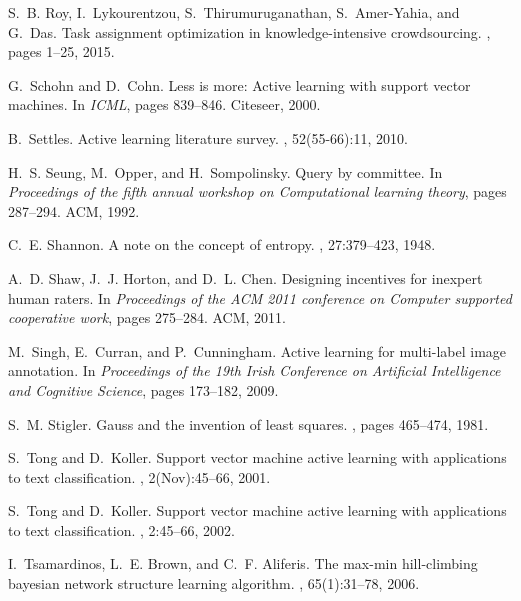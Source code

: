 \documentclass[11pt]{article}
\begin{document}
\begin{thebibliography}{10}
	S.~B. Roy, I.~Lykourentzou, S.~Thirumuruganathan, S.~Amer-Yahia, and G.~Das.
	\newblock Task assignment optimization in knowledge-intensive crowdsourcing.
	, pages 1--25, 2015.
	
	G.~Schohn and D.~Cohn.
	\newblock Less is more: Active learning with support vector machines.
	\newblock In {\em ICML}, pages 839--846. Citeseer, 2000.
	
	B.~Settles.
	\newblock Active learning literature survey.
	, 52(55-66):11, 2010.
	
	H.~S. Seung, M.~Opper, and H.~Sompolinsky.
	\newblock Query by committee.
	\newblock In {\em Proceedings of the fifth annual workshop on Computational
		learning theory}, pages 287--294. ACM, 1992.
	
	C.~E. Shannon.
	\newblock A note on the concept of entropy.
	, 27:379--423, 1948.
	
	A.~D. Shaw, J.~J. Horton, and D.~L. Chen.
	\newblock Designing incentives for inexpert human raters.
	\newblock In {\em Proceedings of the ACM 2011 conference on Computer supported
		cooperative work}, pages 275--284. ACM, 2011.
	
	M.~Singh, E.~Curran, and P.~Cunningham.
	\newblock Active learning for multi-label image annotation.
	\newblock In {\em Proceedings of the 19th Irish Conference on Artificial
		Intelligence and Cognitive Science}, pages 173--182, 2009.
	
	S.~M. Stigler.
	\newblock Gauss and the invention of least squares.
	, pages 465--474, 1981.
	
	S.~Tong and D.~Koller.
	\newblock Support vector machine active learning with applications to text
	classification.
	, 2(Nov):45--66, 2001.
	
	S.~Tong and D.~Koller.
	\newblock Support vector machine active learning with applications to text
	classification.
	, 2:45--66, 2002.
	
	I.~Tsamardinos, L.~E. Brown, and C.~F. Aliferis.
	\newblock The max-min hill-climbing bayesian network structure learning
	algorithm.
	, 65(1):31--78, 2006.
	

\end{thebibliography}
\end{document}
